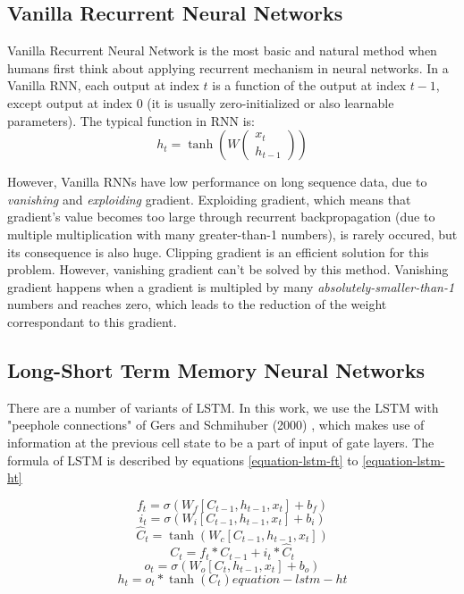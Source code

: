 \subsection{Vanilla Recurrent Neural Networks}
Vanilla Recurrent Neural Network is the most basic and natural method when humans first think about applying recurrent mechanism in neural networks. In a Vanilla RNN, each output at index $\displaystyle t$ is a function of the output at index $\displaystyle t - 1$, except output at index $\displaystyle 0$ (it is usually zero-initialized or also learnable parameters). The typical function in RNN is:
\[ h_t = \tanh \left( W\begin{pmatrix} x_t \\ h_{t-1} \end{pmatrix} \right) \]

However, Vanilla RNNs have low performance on long sequence data, due to \textit{vanishing} and \textit{exploiding} gradient. Exploiding gradient, which means that gradient's value becomes too large through recurrent backpropagation (due to multiple multiplication with many greater-than-1 numbers), is rarely occured, but its consequence is also huge. Clipping gradient \cite{DBLP:Clipping-gradient} is an efficient solution for this problem. However, vanishing gradient can't be solved by this method. Vanishing gradient happens when a gradient is multipled by many \textit{absolutely-smaller-than-1} numbers and reaches zero, which leads to the reduction of the weight correspondant to this gradient.

\subsection{Long-Short Term Memory Neural Networks}
There are a number of variants of LSTM. In this work, we use the LSTM with "peephole connections" of Gers and Schmihuber (2000) \cite{Peephole-LSTM}, which makes use of information at the previous cell state to be a part of input of gate layers. The formula of LSTM is described by equations \eqref{equation-lstm-ft} to \eqref{equation-lstm-ht}

\[ f_t = \sigma(W_f[C_{t-1}, h_{t-1},x_t] + b_f) \label{equation-lstm-ft}\] 
\[ i_t = \sigma(W_i[C_{t-1}, h_{t-1},x_t] + b_i) \label{equation-lstm-it}\]
\[ \hat{C}_t = \tanh(W_c[C_{t-1}, h_{t-1},x_t]) \label{equation-lstm-Chat-t}\]
\[ C_t = f_t * C_{t-1} + i_t * \hat{C}_t \label{equation-lstm-Ct}\]
\[ o_t = \sigma(W_o[C_{t}, h_{t-1},x_t] + b_o) \label{equation-lstm-ot}\]
\[ h_t = o_t * \tanh(C_t) {equation-lstm-ht}\]


